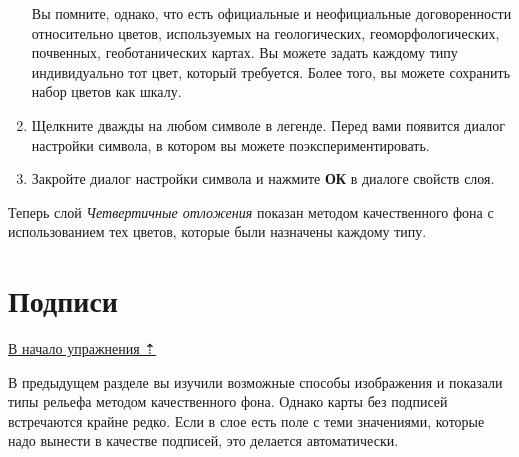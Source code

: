 \documentclass[12pt,]{book}
\begin{document}
\begin{enumerate}
  Вы помните, однако, что есть официальные и неофициальные договоренности относительно цветов, используемых на геологических, геоморфологических, почвенных, геоботанических картах. Вы можете задать каждому типу индивидуально тот цвет, который требуется. Более того, вы можете сохранить набор цветов как шкалу.
\item
  Щелкните дважды на любом символе в легенде. Перед вами появится диалог настройки символа, в котором вы можете поэкспериментировать.
\item
  Закройте диалог настройки символа и нажмите \textbf{ОК} в диалоге свойств слоя.
\end{enumerate}

Теперь слой \emph{Четвертичные отложения} показан методом качественного фона с использованием тех цветов, которые были назначены каждому типу.

\hypertarget{map-design-quaternary-labels}{%
\section{Подписи}\label{map-design-quaternary-labels}}

\protect\hyperlink{map-design-quaternary}{В начало упражнения ⇡}

В предыдущем разделе вы изучили возможные способы изображения и показали типы рельефа методом качественного фона. Однако карты без подписей встречаются крайне редко. Если в слое есть поле с теми значениями, которые надо вынести в качестве подписей, это делается автоматически.
\end{document}
